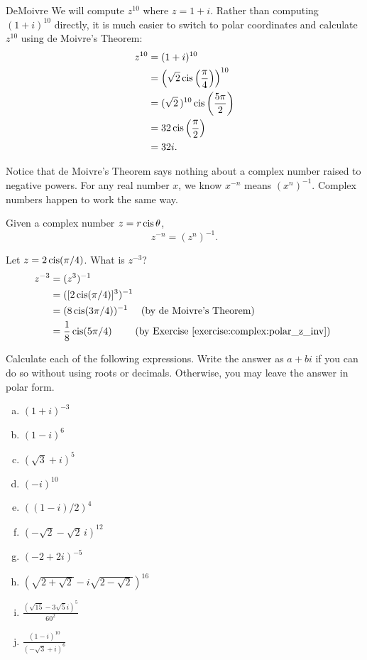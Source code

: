 \begin{example}{DeMoivre} We will compute $z^{10}$ where $z=1+i$. Rather than computing $(1+i)^{10}$ directly, it
is much easier to switch to polar coordinates and calculate $z^{10}$
using de Moivre's Theorem: \begin{align*}
z^{10} & =(1+i)^{10}\\
 & =\left(\sqrt{2}\operatorname{cis}\left(\frac{\pi}{4}\right)\right)^{10}\\
 & =(\sqrt{2}\,)^{10}\operatorname{cis}\left(\frac{5\pi}{2}\right)\\
 & =32\operatorname{cis}\left(\frac{\pi}{2}\right)\\
 & =32i.\end{align*}
 \end{example}
 
\noindent
Notice that de Moivre's Theorem says nothing about a complex number raised to negative powers.  For any real number $x$, we know $x^{-n}$ means $(x^n)^{-1}$.  Complex numbers happen to work the same way.
 
 \begin{defn} \label{polar_negpower}
 Given a complex number $z=r\operatorname{cis}\theta$, 
 \[ z^{-n} = (z^n)^{-1}. \]
 \end{defn}
 
 \begin{example}{5}
Let $z = 2\operatorname{cis}(\pi/4)$.  What is $z^{-3}$?  
 \begin{align*}
  z^{-3} & = (z^3)^{-1} \\
  & = ([2\cis(\pi/4)]^3)^{-1} \\
  & = (8\cis(3\pi/4))^{-1} \quad \mbox{ (by de Moivre's Theorem) } \\
  & = \frac{1}{8}\cis(5\pi/4) \qquad \mbox{ (by Exercise~\ref{exercise:complex:polar_z_inv}) } 
  \end{align*}
  \end{example}
 
 

\begin{exercise}{31}
Calculate each of the following expressions. Write the answer as $a + bi$ if you can do so without using roots or decimals. Otherwise, you may leave the answer in polar form.
\begin{multicols}{2}
\begin{enumerate}[(a)]
 
 \item
$(1+i)^{-3}$
 \item
$(1 - i)^{6}$
 \item
$(\sqrt{3}+i)^{5}$
 \item
$(-i)^{10}$
 \item
$((1-i)/2)^{4}$
 \item
$(-\sqrt{2} - \sqrt{2}\, i)^{12}$
 \item
$(-2+2i)^{-5}$
\item
$(\sqrt{2 + \sqrt{2}} - i\sqrt{2 - \sqrt{2}})^{16}$
\item 
$\frac{(\sqrt{15} -3 \sqrt{5}i)^5}{60^2}$
\item
$\frac{(1-i)^{10}}{(-\sqrt{3} + i)^6}$
\end{enumerate}
\end{multicols}
\end{exercise}


